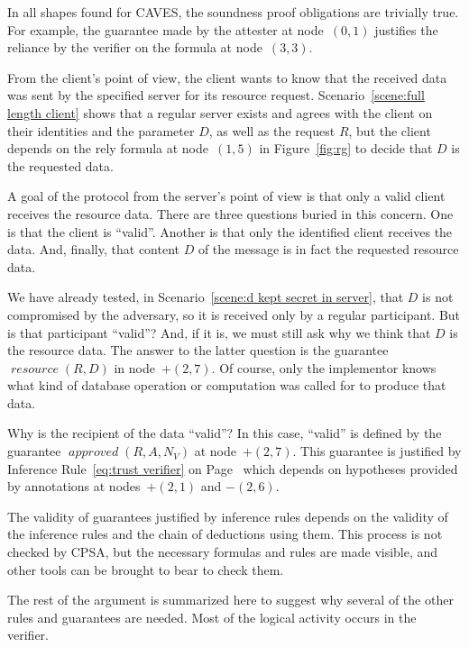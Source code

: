 \documentclass[titlepage,12pt]{article}
\theoremstyle{definition}
\DeclareMathOperator{\resource}{\mathit{resource}}
\DeclareMathOperator{\approved}{\mathit{approved}}
\DeclareMathOperator{\verifier}{\mathit{verifier}}
\begin{document}
In all shapes found for CAVES, the soundness proof obligations are
trivially true.  For example, the guarantee made by the attester at
node~$(0,1)$ justifies the reliance by the verifier on the formula at
node~$(3,3)$.

From the client's point of view, the client wants to know that the
received data was sent by the specified server for its resource
request.  Scenario~\ref{scene:full length client} shows that a regular
server exists and agrees with the client on their identities and the
parameter $D$, as well as the request $R$, but the client depends on
the rely formula at node~$(1,5)$ in Figure~\ref{fig:rg} to decide that
$D$ is the requested data.

A goal of the protocol from the server's point of view is that only a
valid client receives the resource data.  There are three questions
buried in this concern. One is that the client is ``valid''. Another
is that only the identified client receives the data. And, finally,
that content $D$ of the message is in fact the requested resource
data.

We have already tested, in Scenario~\ref{scene:d kept secret in
  server}, that $D$ is not compromised by the adversary, so it is
received only by a regular participant.  But is that participant
``valid''? And, if it is, we must still ask why we think that $D$ is
the resource data. The answer to the latter question is the guarantee
$\resource(R,D)$ in node~$+(2,7).$ Of course, only the implementor
knows what kind of database operation or computation was called for to
produce that data.

Why is the recipient of the data ``valid''? In this case, ``valid'' is
defined by the guarantee $\approved(R,A,N_V)$ at node~$+(2,7)$.  This
guarantee is justified by Inference Rule~\ref{eq:trust verifier}
on Page~\pageref{eq:trust verifier} which depends on hypotheses
provided by annotations at nodes~$+(2,1)$ and $-(2,6)$.

The validity of guarantees justified by inference rules depends on the
validity of the inference rules and the chain of deductions using
them.  This process is not checked by CPSA, but the necessary formulas
and rules are made visible, and other tools can be brought to bear to
check them.

The rest of the argument is summarized here to suggest why several of
the other rules and guarantees are needed. Most of the logical
activity occurs in the verifier.

\iffalse The server sends the data at node~$(2,7)$ after guaranteeing
the client is valid and the data to be sent is associated with the
request.  The server determines the client is valid because it infers
that verifier~$V$ says the client associated with verification
session~$N_V$ is valid at node~$(2,6)$, it guaranteed that~$V$ is a
verifier at node~$(2,1)$ by consulting the $\verifier$ relation in its
initial theory, and it used Inference Rule~\ref{eq:trust verifier} to
conclude that the client is valid because~$V$ said so.  Server
determines the data to be sent is associated with the request by
consulting the $\resource$ relation in its initial theory.  \fi
\end{document}
